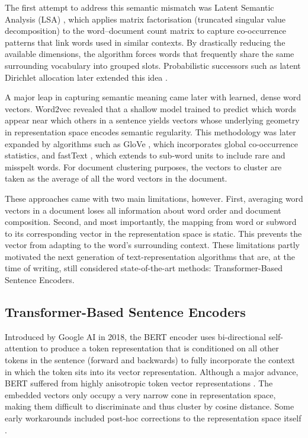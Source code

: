 \documentclass[11pt,a4paper,oneside]{report}
\begin{document}
The first attempt to address this semantic mismatch was Latent Semantic Analysis (LSA)  \citep{deerwester1990lsa}, which applies matrix factorisation (truncated singular value decomposition) to the word--document count matrix to capture co-occurrence patterns that link words used in similar contexts. By drastically reducing the available dimensions, the algorithm forces words that frequently share the same surrounding vocabulary into grouped slots. Probabilistic successors such as latent Dirichlet allocation later extended this idea \citep{blei2003lda}.

A major leap in capturing semantic meaning came later with learned, dense word vectors. Word2vec \citep{mikolov2013efficient,mikolov2013distributed} revealed that a shallow model trained to predict which words appear near which others in a sentence yields vectors whose underlying geometry in representation space encodes semantic regularity. This methodology was later expanded by algorithms such as GloVe \citep{pennington2014glove}, which incorporates global co-occurrence statistics, and fastText \citep{bojanowski2017fasttext}, which extends to sub-word units to include rare and misspelt words. For document clustering purposes, the vectors to cluster are taken as the average of all the word vectors in the document.

These approaches came with two main limitations, however. First, averaging word vectors in a document loses all information about word order and document composition. Second, and most importantly, the mapping from word or subword to its corresponding vector in the representation space is static. This prevents the vector from adapting to the word's surrounding context. These limitations partly motivated the next generation of text-representation algorithms that are, at the time of writing, still considered state-of-the-art methods: Transformer-Based Sentence Encoders.

\subsection{Transformer-Based Sentence Encoders}\label{sec:transenc}

Introduced by Google AI in 2018, the BERT  encoder \citep{devlin2019bert} uses bi-directional self-attention to produce a token representation that is conditioned on all other tokens in the sentence (forward and backwards) to fully incorporate the context in which the token sits into its vector representation. Although a major advance, BERT suffered from highly anisotropic token vector representations \citep{ethayarajh2019contextual}. The embedded vectors only occupy a very narrow cone in representation space, making them difficult to discriminate and thus cluster by cosine distance. Some early workarounds included post-hoc corrections to the representation space itself \citep{li2020sentence,su2021whitening}.
\end{document}
